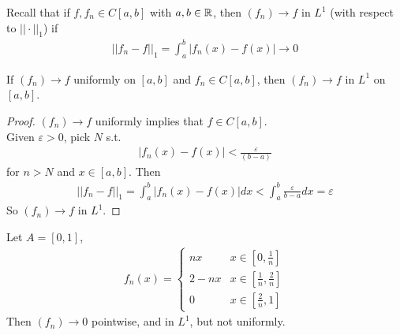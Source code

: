 \documentclass[a4paper]{article}
\begin{document}
Recall that if $f,f_n\in C\left[a,b\right]$ with $a,b\in \mathbb{R}$, then $\left(f_n\right) \to f$ in $L^1$ (with respect to $||\cdot||_1$) if 
\begin{equation*}
\begin{aligned}
||f_n - f||_1 = \int_a^b \left|f_n\left(x\right) - f\left(x\right) \right| \to 0
\end{aligned}
\end{equation*}

\begin{lemma}
If $\left(f_n\right) \to f$ uniformly on $\left[a,b\right]$ and $f_n\in C\left[a,b\right]$, then $\left(f_n\right) \to f$ in $L^1$ on $\left[a,b\right]$.
\begin{proof}
$\left(f_n\right) \to f$ uniformly implies that $f \in C\left[a,b\right]$.\\
Given $\varepsilon>0$, pick $N$ s.t.
\begin{equation*}
\begin{aligned}
\left|f_n\left(x\right) - f\left(x\right) \right| < \frac{\varepsilon}{\left(b-a\right)}
\end{aligned}
\end{equation*}
for $n>N$ and $x \in \left[a,b\right]$. Then
\begin{equation*}
\begin{aligned}
||f_n-f||_1 = \int_a^b \left|f_n\left(x\right) - f\left(x\right) \right| dx < \int_a^b \frac{\varepsilon}{b-a} dx = \varepsilon
\end{aligned}
\end{equation*}
So $\left(f_n\right) \to f$ in $L^1$.
\end{proof}
\end{lemma}

\begin{eg}
Let $A = \left[0,1\right]$,
\begin{equation*}
\begin{aligned}
f_n\left(x\right) = \left\{
\begin{array}{ll}
nx & x\in\left[0,\frac{1}{n}\right]\\
2-nx & x \in \left[\frac{1}{n},\frac{2}{n}\right]\\
0 & x\in \left[\frac{2}{n},1\right]
\end{array}
\right.
\end{aligned}
\end{equation*}
Then $\left(f_n\right) \to 0$ pointwise, and in $L^1$, but not uniformly.
\end{eg}
\end{document}
